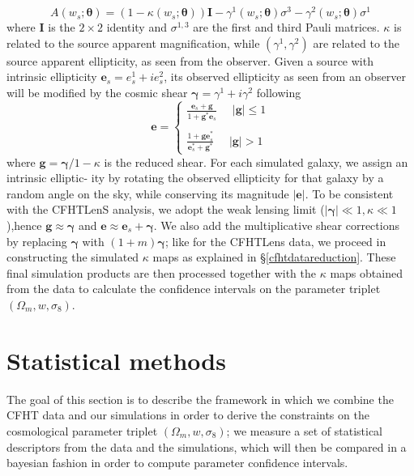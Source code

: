 \documentclass[reprint,aps,prd,superscriptaddress,showkeys]{revtex4-1}
\begin{document}
%
\begin{equation}
A(w_s;\pmb{\theta}) = (1-\kappa(w_s;\pmb{\theta}))\pmb{I} - \gamma^1(w_s;\pmb{\theta})\sigma^3 - \gamma^2(w_s;\pmb{\theta})\sigma^1
\end{equation}  
%
where $\pmb{I}$ is the $2\times2$ identity and $\sigma^{1,3}$ are the first and third Pauli matrices. $\kappa$ is related to the source apparent magnification, while $(\gamma^1,\gamma^2)$ are related to the source apparent ellipticity, as seen from the observer. Given a source with intrinsic ellipticity $\mathbf{e}_s=e^1_s + ie^2_s$, its observed ellipticity as seen from an observer will be modified by the cosmic shear $\pmb{\gamma}=\gamma^1 + i\gamma^2$ following
%
\begin{equation}
\mathbf{e} = 
\begin{cases}
\frac{\mathbf{e}_s+\mathbf{g}}{1+\mathbf{g}^*\mathbf{e}_s} \,\,\,\,\,\,\,\, \vert \mathbf{g}\vert \leq 1 \\ \\
\frac{1+\mathbf{ge}_s^*}{\mathbf{e}_s^* + \mathbf{g}^*} \,\,\,\,\,\,\,\, \vert \mathbf{g}\vert > 1
\end{cases}
\end{equation}
%
where $\mathbf{g} = \pmb{\gamma}/1-\kappa$ is the reduced shear. For each simulated galaxy, we assign an intrinsic elliptic- ity by rotating the observed ellipticity for that galaxy by a random angle on the sky, while conserving its magnitude $\vert\mathbf{e}\vert$. To be consistent with the CFHTLenS analysis, we adopt the weak lensing limit ($\vert\pmb{\gamma}\vert\ll1,\kappa\ll1$),hence $\mathbf{g}\approx\pmb{\gamma}$ and $\mathbf{e}\approx \mathbf{e}_s+\pmb{\gamma}$. We also add the multiplicative shear corrections by replacing $\pmb{\gamma}$ with $(1+m)\pmb{\gamma}$; like for the CFHTLens data, we proceed in constructing the simulated $\kappa$ maps as explained in \S\ref{cfhtdatareduction}. These final simulation products are then processed together with the $\kappa$ maps obtained from the data to calculate the confidence intervals on the parameter triplet $(\Omega_m,w,\sigma_8)$.


\section{Statistical methods}
The goal of this section is to describe the framework in which we combine the CFHT data and our simulations in order to derive the constraints on the cosmological parameter triplet $(\Omega_m,w,\sigma_8)$; we measure a set of statistical descriptors from the data and the simulations, which will then be compared in a bayesian fashion in order to compute parameter confidence intervals.
\end{document}
